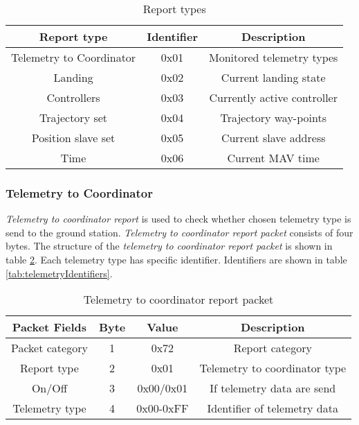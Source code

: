 \begin{table}[H]
\begin{center}
\begin{tabular}{c c c}
\toprule
\rowcolor[HTML]{FFFC9E} 
\textbf{Report type} & \textbf{Identifier} & \textbf{Description}      		   \\ \midrule
Telemetry to Coordinator     & 0x01             & Monitored telemetry types    \\ [1ex]
Landing           			 & 0x02             & Current landing state        \\ [1ex]
Controllers                  & 0x03             & Currently active controller  \\ [1ex]
Trajectory set    		     & 0x04             & Trajectory way-points        \\ [1ex]
Position slave set	         & 0x05             & Current slave address    	   \\ [1ex]
Time     				     & 0x06             & Current MAV time      	   \\ [1ex]
\bottomrule
\end{tabular}
\end{center}
\caption{Report types}
\label{tab:reportTypes}
\end{table}



\subsubsection{Telemetry to Coordinator}
\label{sec:telemetryToCoordinatorReport}
\textit{Telemetry to coordinator report} is used to check whether chosen telemetry type is send to the ground station.
\textit{Telemetry to coordinator report packet} consists of four bytes. The structure of the \textit{telemetry to coordinator report packet} is shown in table \ref{tab:telemetryToCoordinatorReport}. Each telemetry type has specific identifier.  Identifiers are shown in table \ref{tab:telemetryIdentifiers}.
\begin{table}[H]
\begin{center}
\begin{tabular}{c c c c}
\toprule
\rowcolor[HTML]{FFFC9E} 
\textbf{Packet Fields} & \textbf{Byte} & \textbf{Value} & \textbf{Description}          \\ \midrule
Packet category        & 1             & 0x72           & Report category               \\ [1ex]
Report type            & 2             & 0x01           & Telemetry to coordinator type \\ [1ex]
On/Off                 & 3             & 0x00/0x01      & If telemetry data are send     \\ [1ex]
Telemetry type         & 4             & 0x00-0xFF      & Identifier of telemetry data  \\ [1ex]
\bottomrule
\end{tabular}
\end{center}
\caption{Telemetry to coordinator report packet}
\label{tab:telemetryToCoordinatorReport}
\end{table}

